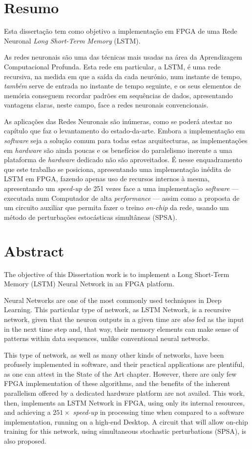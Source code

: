\chapter*{Resumo}

Esta dissertação tem como objetivo a implementação em FPGA de uma Rede Neuronal \textit{Long Short-Term Memory} (LSTM).

As redes neuronais são uma das técnicas mais usadas na área da Aprendizagem Computacional Profunda.
Esta rede em particular, a LSTM, é uma rede recursiva, na medida em que a saída
da cada neurónio, num instante de tempo, \emph{também} serve de entrada no instante de tempo seguinte, e
os seus elementos de memória conseguem recordar padrões em sequências de dados,
apresentando vantagens claras, neste campo, face a redes neuronais convencionais.

As aplicações das Redes Neuronais são inúmeras, como se poderá atestar no capítulo
que faz o levantamento do estado-da-arte. Embora a implementação em \textit{software}
seja a solução comum para todas estas arquitecturas, as implementações em \textit{hardware}
são ainda poucas e os benefícios do paralelismo inerente a uma plataforma de \textit{hardware} dedicado não
são aproveitados. É nesse enquadramento que este trabalho se posiciona, apresentando uma implementação inédita de LSTM em FPGA,
fazendo apenas uso de recursos internos à mesma, apresentando um \textit{speed-up} de 251 vezes face
a uma implementação \textit{software} --- executada num Computador de alta \textit{performance} --- assim como a
proposta de um circuito auxiliar que permita fazer o treino \textit{on-chip} da rede, usando um método de perturbações
estocásticas simultâneas (SPSA).


\chapter*{Abstract}

The objective of this Dissertation work is to implement a Long Short-Term Memory (LSTM) Neural
Network in an FPGA platform.

Neural Networks are one of the most commonly used techniques in Deep Learning.
This particular type of network, as LSTM Network, is a recursive network, given that the neuron outputs in a
given time are \emph{also} fed as the input in the next time step and, that way, their memory elements can
make sense of patterns within data sequences, unlike conventional neural networks.

This type of network, as well as many other kinds of networks, have been profusely implemented
in software, and their practical applications are plentiful, as one can attest
in the State of the Art chapter. However, there are only few FPGA implementation of these algorithms, and the benefits of the inherent
parallelism offered by a dedicated hardware platform are not availed. This work, then, implements an LSTM Network in FPGA, using only
its internal resources, and achieving a $251 \times$ \textit{speed-up} in processing time when compared to a software implementation,
running on a high-end Desktop. A circuit that will allow on-chip training for this network, using simultaneous stochastic perturbations (SPSA),
is also proposed.
